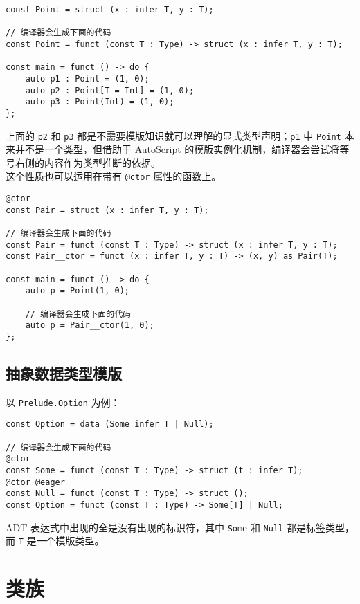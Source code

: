 \begin{lstlisting}
const Point = struct (x : infer T, y : T);

// 编译器会生成下面的代码
const Point = funct (const T : Type) -> struct (x : infer T, y : T);

const main = funct () -> do {
	auto p1 : Point = (1, 0);
	auto p2 : Point[T = Int] = (1, 0);
	auto p3 : Point(Int) = (1, 0);
};
\end{lstlisting}

上面的 \lstinline!p2! 和 \lstinline!p3! 都是不需要模版知识就可以理解的显式类型声明；\lstinline!p1! 中 \lstinline!Point! 本来并不是一个类型，但借助于 AutoScript 的模版实例化机制，编译器会尝试将等号右侧的内容作为类型推断的依据。 \\

这个性质也可以运用在带有 \lstinline!@ctor! 属性的函数上。

\begin{lstlisting}
@ctor
const Pair = struct (x : infer T, y : T);

// 编译器会生成下面的代码
const Pair = funct (const T : Type) -> struct (x : infer T, y : T);
const Pair__ctor = funct (x : infer T, y : T) -> (x, y) as Pair(T);

const main = funct () -> do {
	auto p = Point(1, 0);
	
	// 编译器会生成下面的代码
	auto p = Pair__ctor(1, 0);
};
\end{lstlisting}


\subsection{抽象数据类型模版}

以 \lstinline!Prelude.Option! 为例：

\begin{lstlisting}
const Option = data (Some infer T | Null);

// 编译器会生成下面的代码
@ctor
const Some = funct (const T : Type) -> struct (t : infer T);
@ctor @eager
const Null = funct (const T : Type) -> struct ();
const Option = funct (const T : Type) -> Some[T] | Null;
\end{lstlisting}

ADT 表达式中出现的全是没有出现的标识符，其中 \lstinline!Some! 和 \lstinline!Null! 都是标签类型，而 \lstinline!T! 是一个模版类型。


\section{类族}

